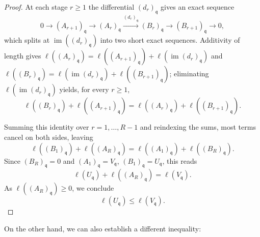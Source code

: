 \documentclass[pdflatex,sn-mathphys-num]{sn-jnl}
\numberwithin{equation}{section}
\theoremstyle{thmstyleone}
\theoremstyle{thmstyletwo}
\begin{document}
\begin{proof}
At each stage $r\ge1$ the differential $(d_r)_{\mathfrak q}$ gives an exact sequence
\[ 0\to (A_{r+1})_{\mathfrak q}\to (A_{r})_{\mathfrak q}\xrightarrow{(d_r)_{\mathfrak q}}(B_{r})_{\mathfrak q}\to (B_{r+1})_{\mathfrak q}\to0,\]
which splits at $\operatorname{im}((d_r)_{\mathfrak q})$ into two short exact sequences.
Additivity of length gives
$\ell((A_{r})_{\mathfrak q})=\ell((A_{r+1})_{\mathfrak q})+\ell(\operatorname{im}(d_r)_{\mathfrak q})$ and
$\ell((B_{r})_{\mathfrak q})=\ell(\operatorname{im}(d_r)_{\mathfrak q})+\ell((B_{r+1})_{\mathfrak q})$; eliminating
$\ell(\operatorname{im}(d_r)_{\mathfrak q})$ yields, for every $r\ge1$,
\begin{equation}\label{eq:additivity}
 \ell((B_r)_{\mathfrak q})+\ell((A_{r+1})_{\mathfrak q})=\ell((A_{r})_{\mathfrak q})+\ell((B_{r+1})_{\mathfrak q}).
\end{equation}

Summing this identity over $r=1,\ldots,R-1$ and reindexing the sums, most terms cancel on both sides, leaving %
\[\ell((B_1)_{\mathfrak q})+\ell((A_R)_{\mathfrak q})=\ell((A_{1})_{\mathfrak q})+\ell((B_{R})_{\mathfrak q}).\]
Since $(B_{R})_{\mathfrak q}=0$ and $(A_{1})_{\mathfrak q}=V_{\mathfrak q}$, $(B_{1})_{\mathfrak q}=U_{\mathfrak q}$, this reads
\[ \ell(U_{\mathfrak q})+\ell((A_{R})_{\mathfrak q})=\ell(V_{\mathfrak q}).\]
As $\ell((A_{R})_{\mathfrak q})\ge0$, we conclude
\[ \ell(U_{\mathfrak q})\le\ell(V_{\mathfrak q}).\]
\end{proof}



\noindent On the other hand, we can also establish a different inequality:
\end{document}
